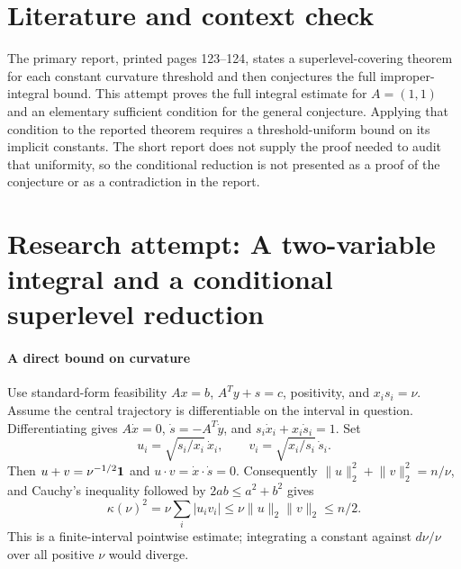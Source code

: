 \documentclass[11pt]{article}
\begin{document}
\section{Literature and context check}
The primary report, printed pages 123--124, states a superlevel-covering theorem for each constant curvature threshold and then conjectures the full improper-integral bound. This attempt proves the full integral estimate for $A=(1,1)$ and an elementary sufficient condition for the general conjecture. Applying that condition to the reported theorem requires a threshold-uniform bound on its implicit constants. The short report does not supply the proof needed to audit that uniformity, so the conditional reduction is not presented as a proof of the conjecture or as a contradiction in the report.
\section{Research attempt: A two-variable integral and a conditional superlevel reduction}

\paragraph{A direct bound on curvature}
Use standard-form feasibility $Ax=b$, $A^Ty+s=c$, positivity, and $x_is_i=\nu$. Assume the central trajectory is differentiable on the interval in question. Differentiating gives $A\dot x=0$, $\dot s=-A^T\dot y$, and $s_i\dot x_i+x_i\dot s_i=1$. Set
\[
 u_i=\sqrt{s_i/x_i}\,\dot x_i,\qquad
 v_i=\sqrt{x_i/s_i}\,\dot s_i.
\]
Then $u+v=\nu^{-1/2}{\bf1}$ and $u\cdot v=\dot x\cdot\dot s=0$. Consequently $\lVert u\rVert_2^2+\lVert v\rVert_2^2=n/\nu$, and Cauchy's inequality followed by $2ab\leq a^2+b^2$ gives
\[
 \kappa(\nu)^2=\nu\sum_i|u_iv_i|
 \leq\nu\lVert u\rVert_2\lVert v\rVert_2\leq n/2.
\]
This is a finite-interval pointwise estimate; integrating a constant against $d\nu/\nu$ over all positive $\nu$ would diverge.
\end{document}

